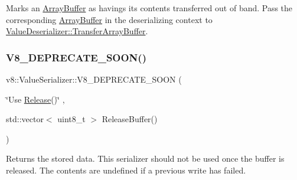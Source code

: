 Marks an \mbox{\hyperlink{classv8_1_1ArrayBuffer}{Array\+Buffer}} as havings its contents transferred out of band. Pass the corresponding \mbox{\hyperlink{classv8_1_1ArrayBuffer}{Array\+Buffer}} in the deserializing context to \mbox{\hyperlink{classv8_1_1ValueDeserializer_a853acc2c7b30571d6719ddd92a48da3b}{Value\+Deserializer\+::\+Transfer\+Array\+Buffer}}. \mbox{\label{classv8_1_1ValueSerializer_a2db107206f6f7965eb17c170cecfafaf}} 
\subsubsection{\texorpdfstring{V8\+\_\+\+D\+E\+P\+R\+E\+C\+A\+T\+E\+\_\+\+S\+O\+O\+N()}{V8\_DEPRECATE\_SOON()}\hspace{0.1cm}{\footnotesize\ttfamily [1/2]}}
{\footnotesize\ttfamily v8\+::\+Value\+Serializer\+::\+V8\+\_\+\+D\+E\+P\+R\+E\+C\+A\+T\+E\+\_\+\+S\+O\+ON (\begin{DoxyParamCaption}\item[{\char`\"{}Use \mbox{\hyperlink{classv8_1_1ValueSerializer_abab0c48c963cd11f98478a4ccc04509c}{Release}}()\char`\"{}}]{,  }\item[{std\+::vector$<$ uint8\+\_\+t $>$ }]{Release\+Buffer() }\end{DoxyParamCaption})}

Returns the stored data. This serializer should not be used once the buffer is released. The contents are undefined if a previous write has failed. \mbox{\label{classv8_1_1ValueSerializer_a2cd82786e44182adee305f71be57019c}} 
